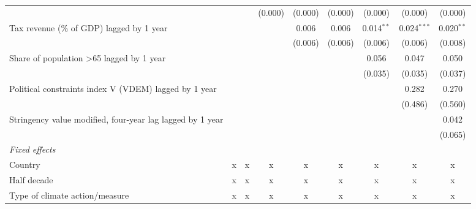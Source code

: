 \begin{tabular}{lcccccccc}
                                                             &               &               & (0.000)       & (0.000)      & (0.000)      & (0.000)      & (0.000)       & (0.000)\\   
   Tax revenue (\% of GDP) lagged by 1 year                  &               &               &               & 0.006        & 0.006        & 0.014$^{**}$ & 0.024$^{***}$ & 0.020$^{**}$\\   
                                                             &               &               &               & (0.006)      & (0.006)      & (0.006)      & (0.006)       & (0.008)\\   
   Share of population >65 lagged by 1 year                  &               &               &               &              &              & 0.056        & 0.047         & 0.050\\   
                                                             &               &               &               &              &              & (0.035)      & (0.035)       & (0.037)\\   
   Political constraints index V (VDEM) lagged by 1 year     &               &               &               &              &              &              & 0.282         & 0.270\\   
                                                             &               &               &               &              &              &              & (0.486)       & (0.560)\\   
   Stringency value modified, four-year lag lagged by 1 year &               &               &               &              &              &              &               & 0.042\\   
                                                             &               &               &               &              &              &              &               & (0.065)\\   
   \emph{Fixed effects}\\
   Country                                                   & x             & x             & x             & x            & x            & x            & x             & x\\  
   Half decade                                               & x             & x             & x             & x            & x            & x            & x             & x\\  
   Type of climate action/measure                            & x             & x             & x             & x            & x            & x            & x             & x\\  

\end{tabular}
